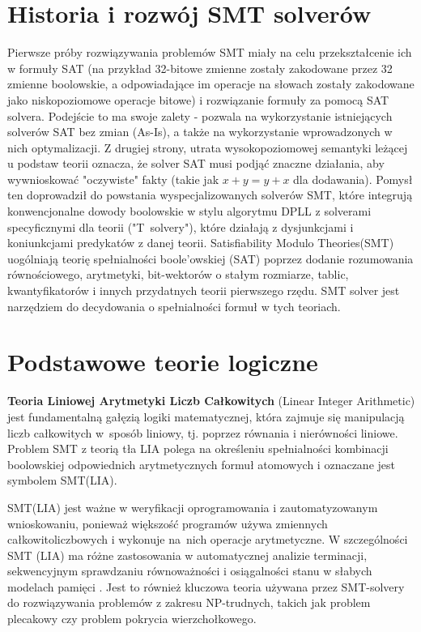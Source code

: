 \section{Historia i rozwój SMT solverów}
Pierwsze próby rozwiązywania problemów SMT miały na celu przekształcenie ich w formuły SAT (na przykład 32-bitowe zmienne zostały zakodowane przez 32 zmienne boolowskie, a odpowiadające im operacje na słowach zostały zakodowane jako niskopoziomowe operacje bitowe) i rozwiązanie formuły za pomocą SAT solvera. Podejście to ma swoje zalety - pozwala na wykorzystanie istniejących solverów SAT bez zmian (As-Is), a także na wykorzystanie wprowadzonych w nich optymalizacji. Z drugiej strony, utrata wysokopoziomowej semantyki leżącej u podstaw teorii oznacza, że solver SAT musi podjąć znaczne działania, aby wywnioskować "oczywiste" fakty (takie jak $x + y = y + x$ dla dodawania). Pomysł ten doprowadził do powstania wyspecjalizowanych solverów SMT, które integrują konwencjonalne dowody boolowskie w stylu algorytmu DPLL z solverami specyficznymi dla teorii ("T~solvery"), które działają z dysjunkcjami i koniunkcjami predykatów z danej teorii. 
Satisfiability Modulo Theories(SMT) uogólniają teorię spełnialności boole'owskiej (SAT) poprzez dodanie rozumowania równościowego, arytmetyki, bit-wektorów o stałym rozmiarze, tablic, kwantyfikatorów i innych przydatnych teorii pierwszego rzędu.
SMT solver jest narzędziem do decydowania o spełnialności formuł w tych teoriach. 

\section{Podstawowe teorie logiczne}

\textbf{Teoria Liniowej Arytmetyki Liczb Całkowitych} (Linear Integer Arithmetic) jest fundamentalną gałęzią logiki matematycznej, która zajmuje się manipulacją liczb całkowitych w~sposób liniowy, tj. poprzez równania i nierówności liniowe. Problem SMT z teorią tła LIA polega na określeniu spełnialności kombinacji boolowskiej odpowiednich arytmetycznych formuł atomowych i oznaczane jest symbolem SMT(LIA). 

SMT(LIA) jest ważne w weryfikacji oprogramowania i zautomatyzowanym wnioskowaniu, ponieważ większość programów używa zmiennych całkowitoliczbowych i wykonuje na~nich operacje arytmetyczne. W szczególności SMT (LIA) ma różne zastosowania w automatycznej analizie terminacji, sekwencyjnym sprawdzaniu równoważności i osiągalności stanu w słabych modelach pamięci \cite{CaiLZ22}. Jest to również kluczowa teoria używana przez SMT-solvery do rozwiązywania problemów z zakresu NP-trudnych, takich jak problem plecakowy czy problem pokrycia wierzchołkowego.

